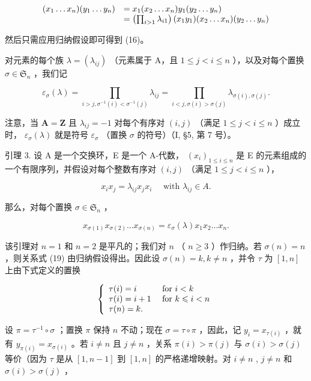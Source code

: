\[
\begin{array}{r l} (x _ {1} \dots x _ {n}) (y _ {1} \dots y _ {n}) & = x _ {1} (x _ {2} \dots x _ {n}) y _ {1} (y _ {2} \dots y _ {n}) \\ & = \left(\prod_ {i > 1} \lambda_ {i 1}\right) (x _ {1} y _ {1}) (x _ {2} \dots x _ {n}) (y _ {2} \dots y _ {n}) \end{array}
\]

然后只需应用归纳假设即可得到 (16)。

对元素的每个族 \(\lambda = (\lambda_{ij})\) （元素属于 A，且 \(1 \leqslant j < i \leqslant n\) ），以及对每个置换 \(\sigma \in \mathfrak{S}_n\) ，我们记

\[
\varepsilon_ {\sigma} (\lambda) = \prod_ {i > j, \sigma^ {- 1} (i) < \sigma^ {- 1} (j)} \lambda_ {i j} = \prod_ {i <   j, \sigma (i) > \sigma (j)} \lambda_ {\sigma (i), \sigma (j)}.\tag{17}
\]

注意，当 \(\mathbf{A} = \mathbf{Z}\) 且 \(\lambda_{ij} = -1\) 对每个有序对 \((i,j)\) （满足 \(1 \leqslant j < i \leqslant n\) ）成立时， \(\varepsilon_{\sigma}(\lambda)\) 就是符号 \(\varepsilon_{\sigma}\) （置换 \(\sigma\) 的符号）（I, §5, 第 7 号）。

引理 3. 设 A 是一个交换环，E 是一个 A-代数， \((x_{i})_{1\leqslant i\leqslant n}\) 是 E 的元素组成的一个有限序列，并假设对每个整数有序对 \((i,j)\) （满足 \(1\leqslant j < i\leqslant n\) ），

\[
x _ {i} x _ {j} = \lambda_ {i j} x _ {j} x _ {i} \quad \text { with } \lambda_ {i j} \in A.\tag{18}
\]

那么，对每个置换 \(\sigma \in \mathfrak{S}_n\) ，

\[
x _ {\sigma (1)} x _ {\sigma (2)} \dots x _ {\sigma (n)} = \varepsilon_ {\sigma} (\lambda) x _ {1} x _ {2} \dots x _ {n}.\tag{19}
\]

该引理对 \(n = 1\) 和 \(n = 2\) 是平凡的；我们对 \(n\) （ \(n \geqslant 3\) ）作归纳。若 \(\sigma(n) = n\) ，则关系式 (19) 由归纳假设得出。因此设 \(\sigma(n) = k, k \neq n\) ，并令 \(\tau\) 为 \([1, n]\) 上由下式定义的置换

\[
\left\{ \begin{array}{l l} \tau (i) = i & \text { for } i <   k \\ \tau (i) = i + 1 & \text { for } k \leqslant i <   n \\ \tau (n) = k. \end{array} \right.
\]

设 \(\pi = \tau^{-1} \circ \sigma\) ；置换 \(\pi\) 保持 \(n\) 不动；现在 \(\sigma = \tau \circ \pi\) ，因此，记 \(y_i = x_{\tau(i)}\) ，就有 \(y_{\pi(i)} = x_{\sigma(i)}\) 。若 \(i \neq n\) 且 \(j \neq n\) ，关系 \(\pi(i) > \pi(j)\) 与 \(\sigma(i) > \sigma(j)\) 等价（因为 \(\tau\) 是从 \([1, n - 1]\) 到 \([1, n]\) 的严格递增映射。对 \(i \neq n\) , \(j \neq n\) 和 \(\sigma(i) > \sigma(j)\) ，

